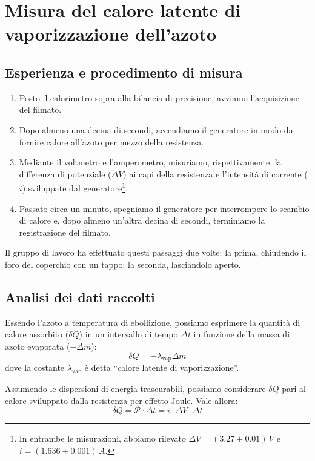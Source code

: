 \documentclass{article}
\begin{document}
\pagebreak

\section{Misura del calore latente di vaporizzazione dell'azoto}

\subsection{Esperienza e procedimento di misura}

\begin{enumerate}
  \item
    Posto il calorimetro sopra alla bilancia di precisione, avviamo
    l'acquisizione del filmato.
  \item
    Dopo almeno una decina di secondi, accendiamo il generatore
    in modo da fornire calore all'azoto per mezzo della resistenza.
  \item
    Mediante il voltmetro e l'amperometro, misuriamo, rispettivamente,
    la differenza di potenziale ($\Delta V$) ai capi della resistenza
    e l'intensità di corrente ($i$) sviluppate dal generatore\footnote{
In entrambe le misurazioni, abbiamo rilevato
$\Delta V = (3.27\pm0.01)\,\unit{V}$ e $i = (1.636\pm0.001)\,\unit{A}$.
    }.
  \item
    Passato circa un minuto, spegniamo il generatore per interrompere
    lo scambio di calore e, dopo almeno un'altra decina di secondi,
    terminiamo la registrazione del filmato.
\end{enumerate}

Il gruppo di lavoro ha effettuato questi passaggi due volte:
la prima, chiudendo il foro del coperchio con un tappo;
la seconda, lasciandolo aperto.

\subsection{Analisi dei dati raccolti}

Essendo l'azoto a temperatura di ebollizione, possiamo esprimere la
quantità di calore assorbito ($\delta Q$) in un intervallo di tempo
$\Delta t$ in funzione della massa di azoto evaporata ($-\Delta m$):
\[\delta Q = - \lambda_\text{vap} \Delta m\] dove la costante
$\lambda_\text{vap}$ è detta “calore latente di vaporizzazione”.

Assumendo le dispersioni di energia trascurabili, possiamo
considerare $\delta Q$ pari al calore sviluppato dalla resistenza per
effetto Joule. Vale allora:
\[ \delta Q = \mathscr{P}\cdot\Delta t = i\cdot\Delta V\cdot\Delta t\]
\end{document}
